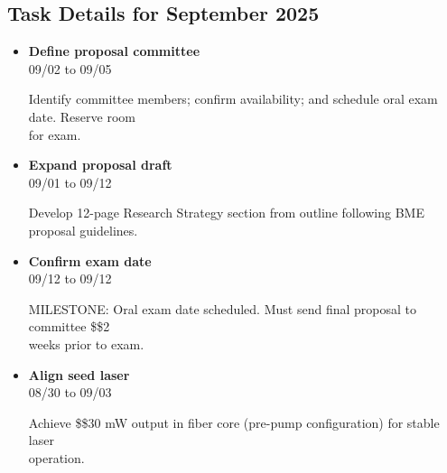 \documentclass[landscape,a4paper]{article}
\begin{document}
\subsection{Task Details for September 2025}
\begin{itemize}[leftmargin=1cm, itemsep=0.8em]
    \item \textcolor{researchcore}{\textbf{Define proposal committee}}\\[0.2em]
          \textcolor{black!70}{\small 09/02 to 09/05}
\\[0.3em]
          \begin{minipage}[t]{0.85\textwidth}
          \textcolor{black!80}{Identify committee members; confirm availability; and schedule oral exam date. Reserve room\\[0.1em]
          for exam.}
          \end{minipage}

    \item \textcolor{researchcore}{\textbf{Expand proposal draft}}\\[0.2em]
          \textcolor{black!70}{\small 09/01 to 09/12}
\\[0.3em]
          \begin{minipage}[t]{0.85\textwidth}
          \textcolor{black!80}{Develop 12-page Research Strategy section from outline following BME proposal guidelines.}
          \end{minipage}

    \item \textcolor{researchcore}{\textbf{Confirm exam date}}\\[0.2em]
          \textcolor{black!70}{\small 09/12 to 09/12}
\\[0.3em]
          \begin{minipage}[t]{0.85\textwidth}
          \textcolor{black!80}{MILESTONE: Oral exam date scheduled. Must send final proposal to committee \$\geq\$2\\[0.1em]
          weeks prior to exam.}
          \end{minipage}

    \item \textcolor{researchexp}{\textbf{Align seed laser}}\\[0.2em]
          \textcolor{black!70}{\small 08/30 to 09/03}
\\[0.3em]
          \begin{minipage}[t]{0.85\textwidth}
          \textcolor{black!80}{Achieve \$\geq\$30 mW output in fiber core (pre-pump configuration) for stable laser\\[0.1em]
          operation.}
          \end{minipage}


\end{itemize}
\end{document}
